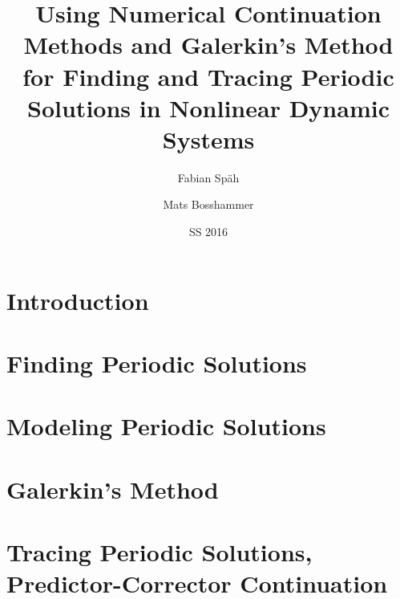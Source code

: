 \documentclass[a4paper,oneside,10pt]{article}
\let\oldsection\section
\renewcommand\section{\clearpage\oldsection}
\begin{document}
\title{Using Numerical Continuation Methods and Galerkin's Method for Finding and Tracing Periodic Solutions in Nonlinear Dynamic Systems} %
\author{Fabian Späh \and Mats Bosshammer}
\date{SS 2016}
\maketitle
\thispagestyle{empty} %

\pagebreak

\thispagestyle{empty} %
\raggedbottom
\tableofcontents %

\pagebreak
\pagestyle{plain} %
\flushbottom



\section{Introduction}


\section{Finding Periodic Solutions}


\section{Modeling Periodic Solutions}


\section{Galerkin's Method}


\section{Tracing Periodic Solutions, Predictor-Corrector Continuation}
\end{document}
